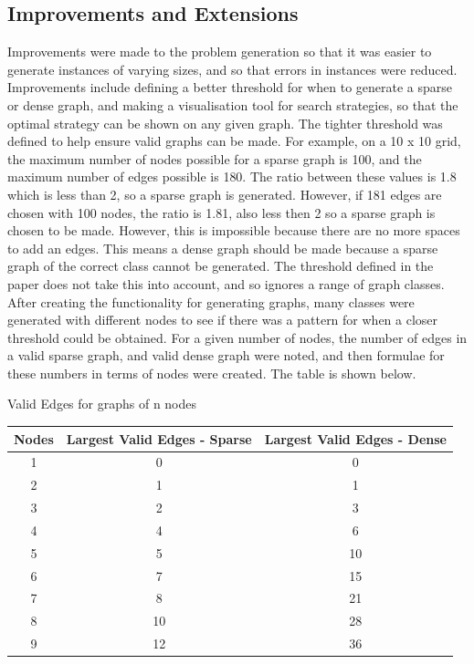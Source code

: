\documentclass{article}
\begin{document}
\subsection{Improvements and Extensions}
Improvements were made to the problem generation so that it was easier to generate instances of varying sizes, and so that errors in instances were reduced. Improvements include defining a better threshold for when to generate a sparse or dense graph, and making a visualisation tool for search strategies, so that the optimal strategy can be shown on any given graph. 
The tighter threshold was defined to help ensure valid graphs can be made. For example, on a 10 x 10 grid, the maximum number of nodes possible for a sparse graph is 100, and the maximum number of edges possible is 180. The ratio between these values is 1.8 which is less than 2, so a sparse graph is generated. However, if 181 edges are chosen with 100 nodes, the ratio is 1.81, also less then 2 so a sparse graph is chosen to be made. However, this is impossible because there are no more spaces to add an edges. This means a dense graph should be made because a sparse graph of the correct class cannot be generated.
 The threshold defined in the paper does not take this into account, and so ignores a range of graph classes. After creating the functionality for generating graphs, many classes were generated with different nodes to see if there was a pattern for when a closer threshold could be obtained. For a given number of nodes, the number of edges in a valid sparse graph, and valid dense graph were noted, and then formulae for these numbers in terms of nodes were created. The table is shown below.

 \begin{center}
    \begin{table}[h]
        Valid Edges for graphs of n nodes\\
        \begin{tabular}{ |c|c|c| }
        \hline
        Nodes & Largest Valid Edges - Sparse  & Largest Valid Edges - Dense\\
        \hline
        1 & 0 & 0 \\ \hline
        2 & 1 & 1 \\ \hline
        3 & 2 & 3 \\ \hline
        4 & 4 & 6 \\ \hline
        5 & 5 & 10 \\ \hline
        6 & 7 & 15\\ \hline
        7 & 8 & 21 \\ \hline
        8 & 10 & 28 \\ \hline
        9 & 12 & 36 \\ \hline
        \end{tabular}
    \end{table}
    \end{center}
\end{document}
